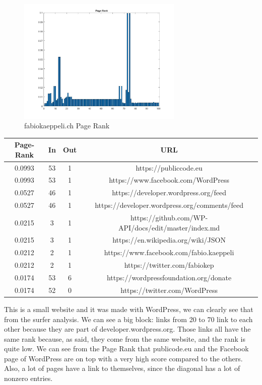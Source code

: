 \documentclass[unicode,11pt,a4paper,oneside,numbers=endperiod,openany]{scrartcl}
\begin{document}
\begin{itemize}
\begin{figure}[H]
    \includegraphics[width=0.7\textwidth]{fk100PR.jpg}
    \caption{fabiokaeppeli.ch Page Rank}
    \end{figure}

\newpage

\begin{center}
 \begin{tabular}{||c | c | c | c||} 
 \hline
 Page-Rank & In & Out & URL \\ [0.5ex] 
 \hline\hline
 0.0993 & 53 & 1 & https://publiccode.eu \\ 
 \hline
 0.0993 & 53 & 1 & https://www.facebook.com/WordPress \\
 \hline
 0.0527 & 46 & 1 & https://developer.wordpress.org/feed \\
 \hline
 0.0527 & 46 & 1 & https://developer.wordpress.org/comments/feed \\
 \hline
 0.0215 & 3 & 1 & https://github.com/WP-API/docs/edit/master/index.md \\
 \hline
 0.0215 & 3 & 1 & https://en.wikipedia.org/wiki/JSON\\
 \hline
 0.0212 & 2 & 1 & https://www.facebook.com/fabio.kaeppeli \\
 \hline
 0.0212 & 2 & 1 & https://twitter.com/fabiokep \\
 \hline
 0.0174 & 53 & 6 & https://wordpressfoundation.org/donate \\
 \hline
 0.0174 & 52 & 0 & https://twitter.com/WordPress \\
 \hline
\end{tabular}
\end{center}

This is a small website and it was made with WordPress, we can clearly see that from the surfer analysis. We can see a big block: links from 20 to 70 link to each other because they are part of developer.wordpress.org. Those links all have the same rank because, as said, they come from the same website, and the rank is quite low. We can see from the Page Rank that publicode.eu and the Facebook page of WordPress are on top with a very high score compared to the others. Also, a lot of pages have a link to themselves, since the diagonal has a lot of nonzero entries.


\end{itemize}
\end{document}
